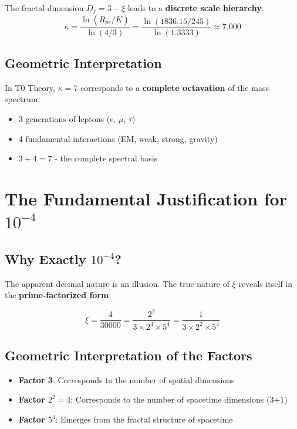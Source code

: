 	The fractal dimension $D_f = 3 - \xi$ leads to a \textbf{discrete scale hierarchy}:
	\begin{equation}
		\kappa = \frac{\ln(R_{pe}/K)}{\ln(4/3)} = \frac{\ln(1836.15/245)}{\ln(1.3333)} \approx 7.000
	\end{equation}
	
	\subsection{Geometric Interpretation}
	
	In T0 Theory, $\kappa = 7$ corresponds to a \textbf{complete octavation} of the mass spectrum:
	\begin{itemize}
		\item 3 generations of leptons (e, $\mu$, $\tau$)
		\item 4 fundamental interactions (EM, weak, strong, gravity)
		\item $3 + 4 = 7$ - the complete spectral basis
	\end{itemize}
	
	\section{The Fundamental Justification for $10^{-4}$}
	
	\subsection{Why Exactly $10^{-4}$?}
	
	The apparent decimal nature is an illusion. The true nature of $\xi$ reveals itself in the \textbf{prime-factorized form}:
	
	\begin{tcolorbox}[colback=green!5!white,colframe=green!75!black,title={Fundamental Factorization}]
		\begin{equation}
			\xi = \frac{4}{30000} = \frac{2^2}{3 \times 2^4 \times 5^4} = \frac{1}{3 \times 2^2 \times 5^4}
		\end{equation}
	\end{tcolorbox}
	
	\subsection{Geometric Interpretation of the Factors}
	
	\begin{itemize}
		\item \textbf{Factor 3}: Corresponds to the number of spatial dimensions
		\item \textbf{Factor $2^2 = 4$}: Corresponds to the number of spacetime dimensions (3+1)
		\item \textbf{Factor $5^4$}: Emerges from the fractal structure of spacetime
	\end{itemize}
	
